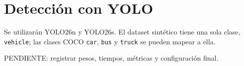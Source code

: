 \section{Detección con YOLO}

Se utilizarán YOLO26n y YOLO26s. El dataset sintético tiene una sola clase,
\texttt{vehicle}; las clases COCO \texttt{car}, \texttt{bus} y \texttt{truck}
se pueden mapear a ella.

PENDIENTE: registrar pesos, tiempos, métricas y configuración final.
